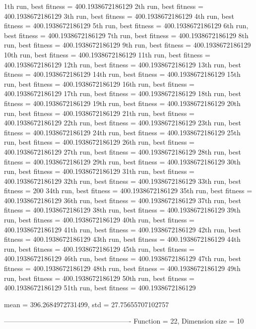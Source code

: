 1th run, best fitness = 400.1938672186129
2th run, best fitness = 400.1938672186129
3th run, best fitness = 400.1938672186129
4th run, best fitness = 400.1938672186129
5th run, best fitness = 400.1938672186129
6th run, best fitness = 400.1938672186129
7th run, best fitness = 400.1938672186129
8th run, best fitness = 400.1938672186129
9th run, best fitness = 400.1938672186129
10th run, best fitness = 400.1938672186129
11th run, best fitness = 400.1938672186129
12th run, best fitness = 400.1938672186129
13th run, best fitness = 400.1938672186129
14th run, best fitness = 400.1938672186129
15th run, best fitness = 400.1938672186129
16th run, best fitness = 400.1938672186129
17th run, best fitness = 400.1938672186129
18th run, best fitness = 400.1938672186129
19th run, best fitness = 400.1938672186129
20th run, best fitness = 400.1938672186129
21th run, best fitness = 400.1938672186129
22th run, best fitness = 400.1938672186129
23th run, best fitness = 400.1938672186129
24th run, best fitness = 400.1938672186129
25th run, best fitness = 400.1938672186129
26th run, best fitness = 400.1938672186129
27th run, best fitness = 400.1938672186129
28th run, best fitness = 400.1938672186129
29th run, best fitness = 400.1938672186129
30th run, best fitness = 400.1938672186129
31th run, best fitness = 400.1938672186129
32th run, best fitness = 400.1938672186129
33th run, best fitness = 200
34th run, best fitness = 400.1938672186129
35th run, best fitness = 400.1938672186129
36th run, best fitness = 400.1938672186129
37th run, best fitness = 400.1938672186129
38th run, best fitness = 400.1938672186129
39th run, best fitness = 400.1938672186129
40th run, best fitness = 400.1938672186129
41th run, best fitness = 400.1938672186129
42th run, best fitness = 400.1938672186129
43th run, best fitness = 400.1938672186129
44th run, best fitness = 400.1938672186129
45th run, best fitness = 400.1938672186129
46th run, best fitness = 400.1938672186129
47th run, best fitness = 400.1938672186129
48th run, best fitness = 400.1938672186129
49th run, best fitness = 400.1938672186129
50th run, best fitness = 400.1938672186129
51th run, best fitness = 400.1938672186129

mean = 396.2684972731499, std = 27.75655707102757

-------------------------------------------------------
Function = 22, Dimension size = 10

